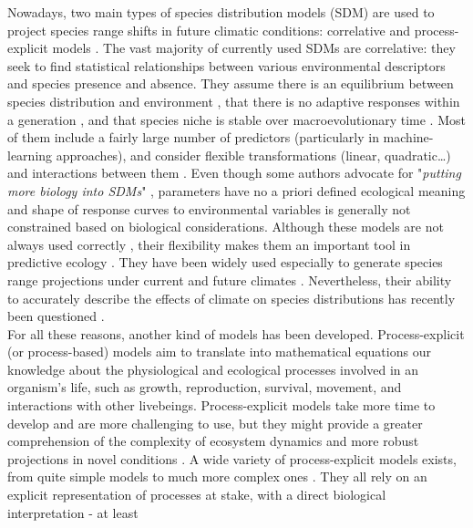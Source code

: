 Nowadays, two main types of species distribution models (SDM) are used
to project species range shifts in future climatic conditions:
correlative and process-explicit models \citep{Dormann2012}. The vast majority of currently used SDMs are correlative: they seek to find
statistical relationships between various environmental descriptors and
species presence and absence. They assume there is an equilibrium
between species distribution and environment \citep[equilibrium postulate,][]{Guisan2005}, that there is no adaptive responses within a generation \citep[no trait plasticity,][]{Berzaghi2020}, and
that species niche is stable over macroevolutionary time \citep[niche conservatism,][]{Pearman2008a}. Most of them include a fairly large number of predictors
(particularly in machine-learning approaches), and consider flexible
transformations (linear, quadratic\ldots) and interactions between them
\citep{Merow2014}. Even
though some authors advocate for "\emph{putting more biology into SDMs}"
\citep{Higgins2012},
parameters have no a priori defined ecological meaning
\citep{Dormann2012} and
shape of response curves to environmental variables is generally not
constrained based on biological considerations. Although these models
are not always used correctly \citep{Araujo2019, Santini2021}, their flexibility makes them an important tool in
predictive ecology \citep{Mouquet2015}. They have been widely used especially to generate species
range projections under current and future climates \citep[e.g.][]{Guisan2005}.
Nevertheless, their ability to accurately describe the effects of
climate on species distributions has recently been questioned \citep[e.g.][]{Fourcade2018, Journe2020, Warren2021}.\\
For all these reasons, another kind of models has been developed.
Process-explicit (or process-based) models aim to translate into mathematical equations our
knowledge about the physiological and ecological processes involved in
an organism's life, such as growth, reproduction, survival, movement,
and interactions with other livebeings. Process-explicit models take more
time to develop and are more challenging to use, but they might provide
a greater comprehension of the complexity of ecosystem dynamics and more
robust projections in novel conditions
\citep{Evans2012, Zurell2016, Singer2016, Urban2016}. A wide
variety of process-explicit models exists, from quite simple models \citep[e.g.][]{Kleidon2000} to much
more complex ones \citep[e.g.][]{Dufrene2005}. They all rely on an explicit representation of
processes at stake, with a direct biological interpretation - at least
